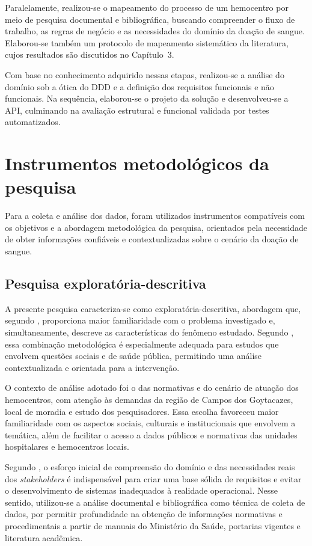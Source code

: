 Paralelamente, realizou-se o mapeamento do processo de um hemocentro por meio de pesquisa documental e bibliográfica, buscando compreender o fluxo de trabalho, as regras de negócio e as necessidades do domínio da doação de sangue. Elaborou-se também um protocolo de mapeamento sistemático da literatura, cujos resultados são discutidos no Capítulo~3.

Com base no conhecimento adquirido nessas etapas, realizou-se a análise do domínio sob a ótica do DDD e a definição dos requisitos funcionais e não funcionais. Na sequência, elaborou-se o projeto da solução e desenvolveu-se a API, culminando na avaliação estrutural e funcional validada por testes automatizados.

\section{Instrumentos metodológicos da pesquisa}

Para a coleta e análise dos dados, foram utilizados instrumentos compatíveis com os objetivos e a abordagem metodológica da pesquisa, orientados pela necessidade de obter informações confiáveis e contextualizadas sobre o cenário da doação de sangue.

\subsection{Pesquisa exploratória-descritiva}

A presente pesquisa caracteriza-se como exploratória-descritiva, abordagem que, segundo , proporciona maior familiaridade com o problema investigado e, simultaneamente, descreve as características do fenômeno estudado. Segundo , essa combinação metodológica é especialmente adequada para estudos que envolvem questões sociais e de saúde pública, permitindo uma análise contextualizada e orientada para a intervenção.

O contexto de análise adotado foi o das normativas e do cenário de atuação dos hemocentros, com atenção às demandas da região de Campos dos Goytacazes, local de moradia e estudo dos pesquisadores. Essa escolha favoreceu maior familiaridade com os aspectos sociais, culturais e institucionais que envolvem a temática, além de facilitar o acesso a dados públicos e normativas das unidades hospitalares e hemocentros locais.

Segundo , o esforço inicial de compreensão do domínio e das necessidades reais dos \textit{stakeholders} é indispensável para criar uma base sólida de requisitos e evitar o desenvolvimento de sistemas inadequados à realidade operacional. Nesse sentido, utilizou-se a análise documental e bibliográfica como técnica de coleta de dados, por permitir profundidade na obtenção de informações normativas e procedimentais a partir de manuais do Ministério da Saúde, portarias vigentes e literatura acadêmica.

